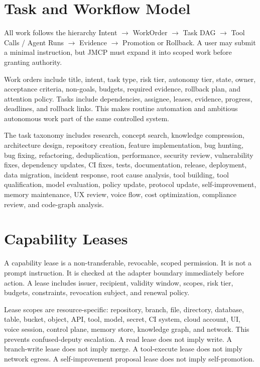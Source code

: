 \documentclass[10pt,journal,onecolumn]{IEEEtran}
\begin{document}
\section{Task and Workflow Model}
All work follows the hierarchy Intent $\rightarrow$ WorkOrder $\rightarrow$ Task DAG $\rightarrow$ Tool Calls / Agent Runs $\rightarrow$ Evidence $\rightarrow$ Promotion or Rollback. A user may submit a minimal instruction, but JMCP must expand it into scoped work before granting authority.

Work orders include title, intent, task type, risk tier, autonomy tier, state, owner, acceptance criteria, non-goals, budgets, required evidence, rollback plan, and attention policy. Tasks include dependencies, assignee, leases, evidence, progress, deadlines, and rollback links. This makes routine automation and ambitious autonomous work part of the same controlled system.

The task taxonomy includes research, concept search, knowledge compression, architecture design, repository creation, feature implementation, bug hunting, bug fixing, refactoring, deduplication, performance, security review, vulnerability fixes, dependency updates, CI fixes, tests, documentation, release, deployment, data migration, incident response, root cause analysis, tool building, tool qualification, model evaluation, policy update, protocol update, self-improvement, memory maintenance, UX review, voice flow, cost optimization, compliance review, and code-graph analysis.

\section{Capability Leases}
A capability lease is a non-transferable, revocable, scoped permission. It is not a prompt instruction. It is checked at the adapter boundary immediately before action. A lease includes issuer, recipient, validity window, scopes, risk tier, budgets, constraints, revocation subject, and renewal policy.

Lease scopes are resource-specific: repository, branch, file, directory, database, table, bucket, object, API, tool, model, secret, CI system, cloud account, UI, voice session, control plane, memory store, knowledge graph, and network. This prevents confused-deputy escalation. A read lease does not imply write. A branch-write lease does not imply merge. A tool-execute lease does not imply network egress. A self-improvement proposal lease does not imply self-promotion.
\end{document}
